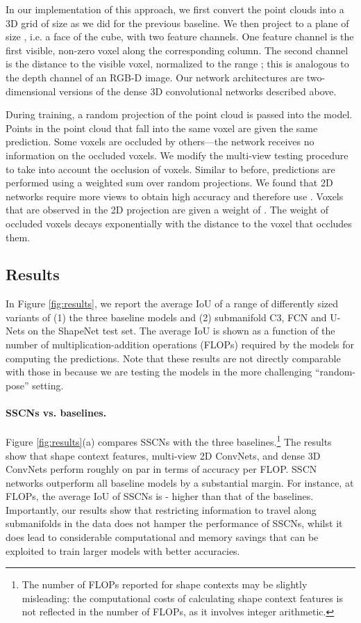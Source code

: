 \documentclass[10pt,twocolumn,letterpaper]{article}
\begin{document}
In our implementation of this approach, we first convert the point clouds into a 3D grid of size  as we did for the previous baseline. We then project to a plane of size , i.e. a face of the cube, with two feature channels. One feature channel is the first visible, non-zero voxel along the corresponding column. The second channel is the distance to the visible voxel, normalized to the range ; this is analogous to the depth channel of an RGB-D image. Our network architectures are two-dimensional versions of the dense 3D convolutional networks described above.

During training, a random projection of the point cloud is passed into the model. Points in the point cloud that fall into the same voxel are given the same prediction. Some voxels are occluded by others---the network receives no information on the occluded voxels.
We modify the multi-view testing procedure to take into account the occlusion of voxels.
Similar to before, predictions are performed using a weighted sum over  random projections. We found that 2D networks require more views to obtain high accuracy and therefore use . Voxels that are observed in the 2D projection are given a weight of . The weight of occluded voxels decays exponentially with the distance to the voxel that occludes them.

\subsection{Results}
In Figure \ref{fig:results}, we report the average IoU of a range of differently sized variants of (1) the three baseline models and (2) submanifold C3, FCN and U-Nets on the ShapeNet test set. The average IoU is shown as a function of the number of multiplication-addition operations (FLOPs) required by the models for computing the predictions. Note that these results are not directly comparable with those in \cite{yi2017large} because we are testing the models in the more challenging ``random-pose'' setting.

\paragraph{SSCNs vs. baselines.} Figure \ref{fig:results}(a) compares SSCNs with the three baselines.\footnote{The number of FLOPs reported for shape contexts may be slightly misleading: the computational costs of calculating shape context features is not reflected in the number of FLOPs, as it involves integer arithmetic.}
The results show that shape context features, multi-view 2D ConvNets, and dense 3D ConvNets perform roughly on par in terms of accuracy per FLOP. SSCN networks outperform all baseline models by a substantial margin. For instance, at  FLOPs, the average IoU of SSCNs is - higher than that of the baselines. Importantly, our results show that restricting information to travel along submanifolds in the data does not hamper the performance of SSCNs, whilst it does lead to considerable computational and memory savings that can be exploited to train larger models with better accuracies.
\end{document}
